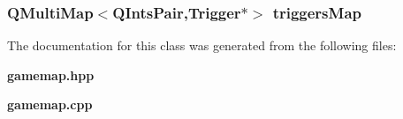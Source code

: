\subsubsection{\setlength{\rightskip}{0pt plus 5cm}QMulti\-Map$<${\bf QInts\-Pair},{\bf Trigger}$\ast$$>$ {\bf triggers\-Map}\hspace{0.3cm}{\tt  [protected]}}\label{classGameMap_p7}




The documentation for this class was generated from the following files:\begin{CompactItemize}
\item 
{\bf gamemap.hpp}\item 
{\bf gamemap.cpp}\end{CompactItemize}
